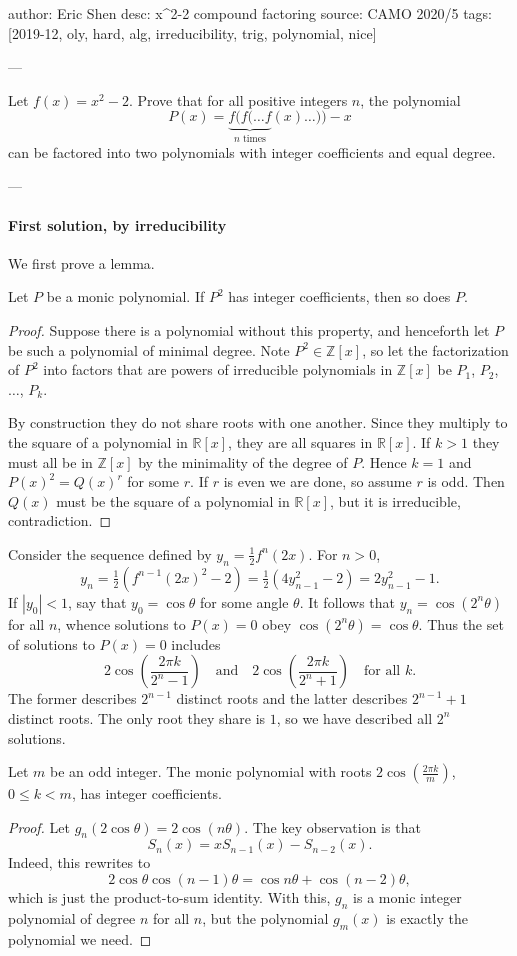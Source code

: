 author: Eric Shen
desc: x^2-2 compound factoring
source: CAMO 2020/5
tags: [2019-12, oly, hard, alg, irreducibility, trig, polynomial, nice]

---

Let $f(x)=x^2-2$. Prove that for all positive integers $n$, the polynomial \[P(x)=\underbrace{f(f(\ldots f}_{n\text{ times}}(x)\ldots))-x\]
can be factored into two polynomials with integer coefficients and equal degree.

---

\paragraph{First solution, by irreducibility}     We first prove a lemma.
\begin{lemma*}
    Let $P$ be a monic polynomial. If $P^2$ has integer coefficients, then so does $P$.
\end{lemma*}
\begin{proof}
    Suppose there is a polynomial without this property, and henceforth let $P$ be such a polynomial of minimal degree. Note $P^2\in\mathbb Z[x]$, so let the factorization of $P^2$ into factors that are powers of irreducible polynomials in $\mathbb Z[x]$ be $P_1$, $P_2$, $\ldots$, $P_k$.

    By construction they do not share roots with one another. Since they multiply to the square of a polynomial in $\mathbb R[x]$, they are all squares in $\mathbb R[x]$. If $k>1$ they must all be in $\mathbb Z[x]$ by the minimality of the degree of $P$. Hence $k=1$ and $P(x)^2=Q(x)^r$ for some $r$. If $r$ is even we are done, so assume $r$ is odd. Then $Q(x)$ must be the square of a polynomial in $\mathbb R[x]$, but it is irreducible, contradiction.
\end{proof}

Consider the sequence defined by $y_n=\frac12f^n(2x)$. For $n>0$, \[y_n=\tfrac12(f^{n-1}(2x)^2-2)=\tfrac12(4y_{n-1}^2-2)=2y_{n-1}^2-1.\]
If $|y_0|<1$, say that $y_0=\cos\theta$ for some angle $\theta$. It follows that $y_n=\cos(2^n\theta)$ for all $n$, whence solutions to $P(x)=0$ obey $\cos(2^n\theta)=\cos\theta$. Thus the set of solutions to $P(x)=0$ includes \[2\cos\left(\frac{2\pi k}{2^n-1}\right)\quad\text{and}\quad2\cos\left(\frac{2\pi k}{2^n+1}\right)\quad\text{for all }k.\]
The former describes $2^{n-1}$ distinct roots and the latter describes $2^{n-1}+1$ distinct roots. The only root they share is $1$, so we have described all $2^n$ solutions.
\begin{claim*}
    Let $m$ be an odd integer. The monic polynomial with roots $2\cos(\frac{2\pi k}m)$, $0\le k<m$, has integer coefficients.
\end{claim*}
\begin{proof}
    Let $g_n(2\cos\theta)=2\cos(n\theta)$. The key observation is that \[S_n(x)=xS_{n-1}(x)-S_{n-2}(x).\]
    Indeed, this rewrites to \[2\cos\theta\cos(n-1)\theta=\cos n\theta+\cos(n-2)\theta,\]
    which is just the product-to-sum identity. With this, $g_n$ is a monic integer polynomial of degree $n$ for all $n$, but the polynomial $g_m(x)$ is exactly the polynomial we need.
\end{proof}


